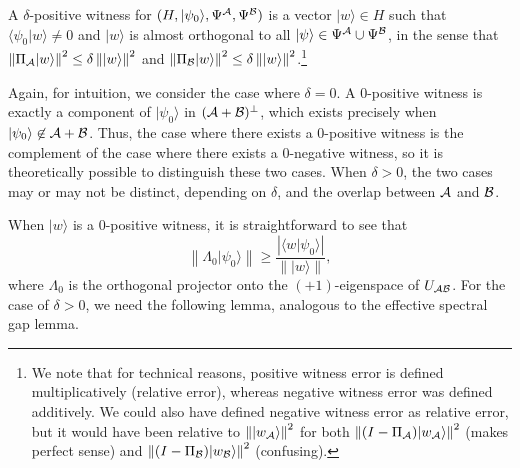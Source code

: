 \documentclass{theoretics}
\def\ket#1{{\lvert}#1\rangle}
\renewcommand{\>}{\rangle}
\newcommand{\<}{\langle}
\renewcommand{\(}{\left(}
\renewcommand{\)}{\right)}
\def\braket#1#2{{{\langle}#1\vert}#2\rangle}
\def\norm#1{\left\| #1 \right\|}
\begin{document}
\begin{definition}\label{def:pos-witness}
A $\delta$-positive witness for $(H,\ket{\psi_0},\Psi^{\cal A},\Psi^{\cal B})$ is a vector $\ket{w}\in H$ such that $\braket{\psi_0}{w}\neq 0$ and $\ket{w}$ is almost orthogonal to all $\ket{\psi}\in \Psi^{\cal A}\cup \Psi^{\cal B}$, in the sense that $\norm{\Pi_{\cal A}\ket{w}}^2\leq \delta\norm{\ket{w}}^2$ and $\norm{\Pi_{\cal B}\ket{w}}^2\leq \delta\norm{\ket{w}}^2$.\footnote{We note that for technical reasons, positive witness error is defined multiplicatively (relative error), whereas negative witness error was defined additively. We could also have defined negative witness error as relative error, but it would have been relative to $\norm{\ket{w_{\cal A}}}^2$ for both $\norm{(I-\Pi_{\cal A})\ket{w_{\cal A}}}^2$ (makes perfect sense) and $\norm{(I-\Pi_{\cal B})\ket{w_{\cal B}}}^2$ (confusing).} 
\end{definition}

Again, for intuition, we consider the case where $\delta=0$. A 0-positive witness is exactly a component of $\ket{\psi_0}$ in $({\cal A}+{\cal B})^\bot$, which exists precisely when $\ket{\psi_0}\not\in {\cal A}+{\cal B}$. Thus, the case where there exists a 0-positive witness is the complement of the case where there exists a 0-negative witness, so it is theoretically possible to distinguish these two cases. When $\delta>0$, the two cases may or may not be distinct, depending on $\delta$, and the overlap between ${\cal A}$ and ${\cal B}$. 

When $\ket{w}$ is a $0$-positive witness, it is straightforward to see that 
\begin{equation*}
\norm{\Lambda_0\ket{\psi_0}} \geq \frac{|\braket{w}{\psi_0}|}{\norm{\ket{w}}},
\end{equation*}
where $\Lambda_0$ is the orthogonal projector onto the $(+1)$-eigenspace of $U_{\cal AB}$. For the case of $\delta>0$, we need the following lemma, analogous to the effective spectral gap lemma.
\end{document}
